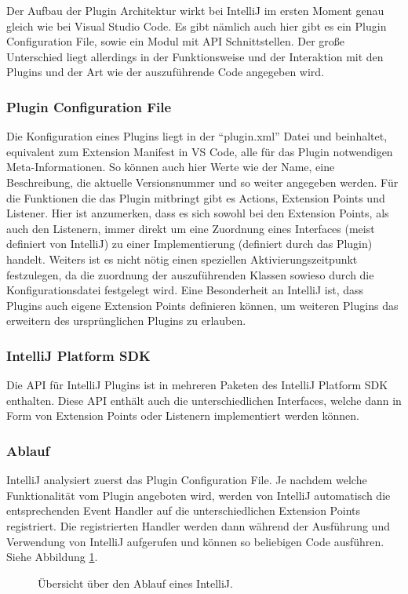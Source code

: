 Der Aufbau der Plugin Architektur wirkt bei IntelliJ im ersten Moment genau
gleich wie bei Visual Studio Code. Es gibt nämlich auch hier gibt
es ein Plugin Configuration File, sowie ein Modul mit API Schnittstellen.
Der große Unterschied liegt allerdings in der Funktionsweise und der Interaktion
mit den Plugins und der Art wie der auszuführende Code angegeben wird.
\subsubsection{Plugin Configuration File}
  Die Konfiguration eines Plugins liegt in der \enquote{plugin.xml} Datei und
  beinhaltet, equivalent zum Extension Manifest in VS Code, alle für das Plugin
  notwendigen Meta-Informationen. So können auch hier Werte wie der Name,
  eine Beschreibung, die aktuelle Versionsnummer und so weiter angegeben werden.
  Für die Funktionen die das Plugin mitbringt gibt es Actions, Extension Points
  und Listener. Hier ist anzumerken, dass es sich sowohl bei den Extension Points,
  als auch den Listenern, immer direkt um eine Zuordnung eines Interfaces
  (meist definiert von IntelliJ) zu einer Implementierung (definiert durch das Plugin)
  handelt. Weiters ist es nicht nötig einen speziellen Aktivierungszeitpunkt
  festzulegen, da die zuordnung der auszuführenden Klassen sowieso durch 
  die Konfigurationsdatei festgelegt wird. Eine Besonderheit an IntelliJ ist,
  dass Plugins auch eigene Extension Points definieren können, um weiteren Plugins
  das erweitern des ursprünglichen Plugins zu erlauben.
\subsubsection{IntelliJ Platform SDK}
  Die API für IntelliJ Plugins ist in mehreren Paketen des IntelliJ 
  Platform SDK enthalten. Diese API enthält auch die unterschiedlichen
  Interfaces, welche dann in Form von Extension Points oder Listenern implementiert
  werden können. 
\subsubsection{Ablauf}
  IntelliJ analysiert zuerst das Plugin Configuration File.
  Je nachdem welche Funktionalität vom Plugin angeboten wird, werden
  von IntelliJ automatisch die entsprechenden Event Handler 
  auf die unterschiedlichen Extension Points registriert. 
  Die registrierten Handler werden dann während der Ausführung und Verwendung
  von IntelliJ aufgerufen und können so beliebigen Code ausführen.
  Siehe Abbildung \ref{fig:diagram_IntelliJExtensionArchitecture}.
  \begin{figure}
    \centering
    \caption{Übersicht über den Ablauf eines IntelliJ.}
    \label{fig:diagram_IntelliJExtensionArchitecture}
  \end{figure}   

